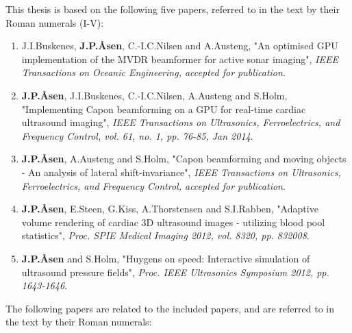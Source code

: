 \documentclass[10pt,b5paper,twoside]{book}
\begin{document}
This thesis is based on the following five papers, referred to in the text by their Roman numerals (I-V): 
\begin{enumerate}[I]
\renewcommand\labelenumi{\bfseries\theenumi}
	\item J.\:I.\:Buskenes, \textbf{J.\:P.\:\AA{}sen}, C.-I.\:C.\:Nilsen and A.\:Austeng, "An optimised GPU implementation of the MVDR beamformer for active sonar imaging", {\it  IEEE Transactions on Oceanic Engineering, accepted for publication}.
	\item \textbf{J.\:P.\:\AA{}sen}, J.\:I.\:Buskenes, C.-I.\:C.\:Nilsen, A.\:Austeng and S.\:Holm, "Implementing Capon beamforming on a GPU for real-time cardiac ultrasound imaging", {\it IEEE Transactions on Ultrasonics, Ferroelectrics, and Frequency Control, vol. 61, no. 1, pp. 76-85, Jan 2014}.
 	\item \textbf{J.\:P.\:\AA{}sen}, A.\:Austeng and S.\:Holm, "Capon beamforming and moving objects - An analysis of lateral shift-invariance", {\it IEEE Transactions on Ultrasonics, Ferroelectrics, and Frequency Control, accepted for publication}.
	\item \textbf{J.\:P.\:\AA{}sen}, E.\:Steen, G.\:Kiss, A.\:Thorstensen and S.\:I.\:Rabben, "Adaptive volume rendering of cardiac 3D ultrasound images - utilizing blood pool statistics", {\it Proc. SPIE Medical Imaging 2012, vol. 8320, pp. 832008}.
	\item \textbf{J.\:P.\:\AA{}sen} and S.\:Holm, "Huygens on speed: Interactive simulation of ultrasound pressure fields", {\it Proc. IEEE Ultrasonics Symposium 2012, pp. 1643-1646}.
\end{enumerate}  

The following papers are related to the included papers, and are referred to in the text by their Roman numerals: 
\end{document}
